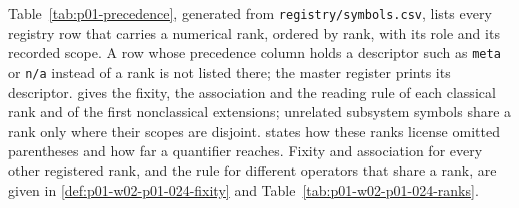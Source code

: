 Table~\ref{tab:p01-precedence}, generated from \texttt{registry/symbols.csv},
lists every registry row that carries a numerical rank, ordered by rank,
with its role and its recorded scope.  A row whose precedence column
holds a descriptor such as \texttt{meta} or \texttt{n/a} instead of a rank
is not listed there; the master register prints its descriptor.
 gives the fixity, the association and
the reading rule of each classical rank and of the first nonclassical
extensions; unrelated subsystem symbols share a rank only where their
scopes are disjoint.   states
how these ranks license omitted parentheses and how far a quantifier
reaches.  Fixity and association for every other registered rank, and the
rule for different operators that share a rank, are given in
\cref{def:p01-w02-p01-024-fixity} and
Table~\ref{tab:p01-w02-p01-024-ranks}.


